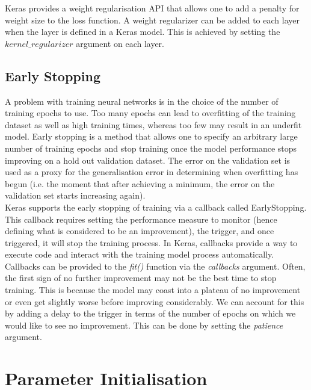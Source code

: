 Keras provides a weight regularisation API that allows one to add a penalty for weight size to the loss function. A weight regularizer can be added to each layer when the layer is defined in a Keras model. This is achieved by setting the $kernel\_regularizer$ argument on each layer.

\subsection{Early Stopping}
A problem with training neural networks is in the choice of the number of training epochs to use. Too many epochs can lead to overfitting of the training dataset as well as high training times, whereas too few may result in an underfit model. Early stopping is a method that allows one to specify an arbitrary large number of training epochs and stop training once the model performance stops improving on a hold out validation dataset. The error on the validation set is used as a proxy for the generalisation error in determining when overfitting has begun (i.e. the moment that after achieving a minimum, the error on the validation set starts increasing again).\\

Keras supports the early stopping of training via a callback called EarlyStopping. This callback requires setting the performance measure to monitor (hence defining what is considered to be an improvement), the trigger, and once triggered, it will stop the training process. In Keras, callbacks provide a way to execute code and interact with the training model process automatically. Callbacks can be provided to the \textit{fit()} function via the \textit{callbacks} argument. Often, the first sign of no further improvement may not be the best time to stop training. This is because the model may coast into a plateau of no improvement or even get slightly worse before improving considerably. We can account for this by adding a delay to the trigger in terms of the number of epochs on which we would like to see no improvement. This can be done by setting the \textit{patience} argument. \\

 
 \section{Parameter Initialisation}

